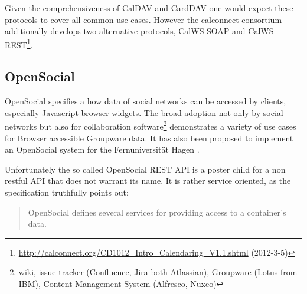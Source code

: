 \documentclass[11pt,a4paper,headsepline,twoside]{scrartcl}		%
\newcommand{\citeurl}[2]{\url{#1} (#2)}
\begin{document}

Given the comprehensiveness of CalDAV and CardDAV one would expect these
protocols to cover all common use cases. However the calconnect consortium
additionally develops two alternative protocols, CalWS-SOAP and
CalWS-REST\footnote{\citeurl{http://calconnect.org/CD1012_Intro_Calendaring_V1.1.shtml}{2012-3-5}}.

\subsection{OpenSocial}
\label{sec:opensocial-background}


OpenSocial \cite{OSSpec2.0.1} specifies a how data of social networks can be
accessed by clients, especially Javascript browser widgets. The broad adoption
not only by social networks but also for collaboration software\footnote{wiki,
  issue tracker (Confluence, Jira both Atlassian), Groupware (Lotus from IBM),
  Content Management System (Alfresco, Nuxeo)} demonstrates a variety of use
cases for Browser accessible Groupware data. It has also been proposed to
implement an OpenSocial system for the Fernuniversität Hagen \cite{Huebner2009}.

Unfortunately the so called OpenSocial REST API is a poster child for a non
restful API that does not warrant its name. It is rather service oriented, as
the specification truthfully points out\cite[Social API Server, sec
2,Services]{OSSpec2.0.1}:
\begin{quote}
  OpenSocial defines several services for providing access to a container's data.
\end{quote}
\end{document}
